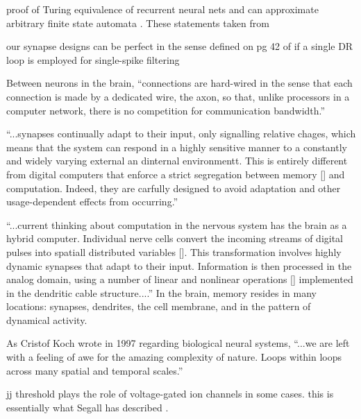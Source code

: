 \documentclass[twocolumn]{article}
\begin{document}
\vspace{3em}
proof of Turing equivalence of recurrent neural nets \cite{kisi1996} and can approximate arbitrary finite state automata \cite{omgi1994}. These statements taken from \cite{vesc2007}

\vspace{3em}
our synapse designs can be perfect in the sense defined on pg 42 of \cite{li1997} if a single DR loop is employed for single-spike filtering

\vspace{3em}
Between neurons in the brain, ``connections are hard-wired in the sense that each connection is made by a dedicated wire, the axon, so that, unlike processors in a computer network, there is no competition for communication bandwidth.'' \cite{ko1997}

\vspace{3em}
``...synapses continually adapt to their input, only signalling relative chages, which means that the system can respond in a highly sensitive manner to a constantly and widely varying external an dinternal environmentt. This is entirely different from digital computers that enforce a strict segregation between memory [] and computation. Indeed, they are carfully designed to avoid adaptation and other usage-dependent effects from occurring.'' \cite{ko1997}

\vspace{3em}
``...current thinking about computation in the nervous system has the brain as a hybrid computer. Individual nerve cells convert the incoming streams of digital pulses into spatiall distributed variables []. This transformation involves highly dynamic synapses that adapt to their input. Information is then processed in the analog domain, using a number of linear and nonlinear operations [] implemented in the dendritic cable structure....'' \cite{ko1997} In the brain, memory resides in many locations: synapses, dendrites, the cell membrane, and in the pattern of dynamical activity. 

\vspace{3em}
As Cristof Koch wrote in 1997 regarding biological neural systems, ``...we are left with a feeling of awe for the amazing complexity of nature. Loops within loops across many spatial and temporal scales.'' \cite{ko1997} 

\vspace{3em}
jj threshold plays the role of voltage-gated ion channels in some cases. this is essentially what Segall has described \cite{crsc2010}.




\end{document}
